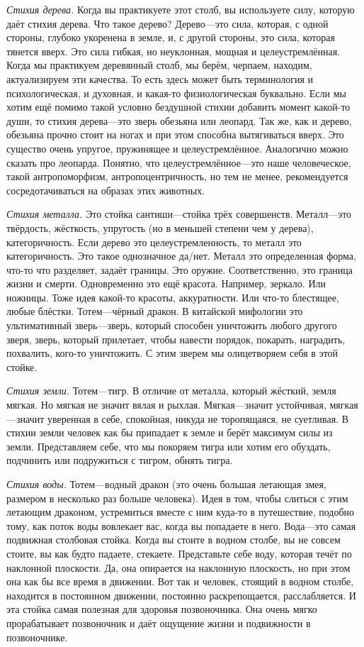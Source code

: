 {\it Стихия дерева.}
Когда вы практикуете этот столб,
вы используете силу,
которую даёт стихия дерева.
Что такое дерево? Дерево---это сила,
которая, с одной стороны, глубоко укоренена
в земле, и, с другой стороны,
это сила, которая тянется вверх. Это сила гибкая,
но неуклонная,
мощная и
целеустремлённая.
Когда мы практикуем деревянный столб, мы
берём,
черпаем, находим,
актуализируем эти
качества. То есть здесь может быть терминология
и психологическая, и духовная,
и какая-то физиологическая буквально.
Если мы хотим ещё помимо
такой условно бездушной стихии
добавить момент какой-то души,
то стихия дерева---это зверь
обезьяна или леопард.
Так же, как и дерево,
обезьяна прочно стоит на ногах и при
этом способна вытягиваться вверх. Это существо очень
упругое, пружинящее и
целеустремлённое. Аналогично можно сказать про леопарда.
Понятно, что целеустремлённое---это наше человеческое,
такой антропоморфизм,
антропоцентричность, но тем не менее,
рекомендуется сосредотачиваться
на образах этих животных.

{\it Стихия металла.} Это стойка сантиши---стойка трёх
совершенств. Металл---это твёрдость,
жёсткость, упругость (но в меньшей степени чем у дерева),
категоричность. Если дерево это целеустремленность, то металл это категоричность.
Это такое
однозначное да/нет.
Металл это определенная форма, что-то что разделяет,
задаёт границы.
Это оружие. Соответственно, это граница жизни и смерти.
Одновременно это ещё красота. Например, зеркало.
Или ножницы. Тоже идея
какой-то красоты, аккуратности.
Или что-то блестящее, любые блёстки.
Тотем---чёрный дракон.
В китайской мифологии это ультимативный зверь---зверь, который способен уничтожить
любого другого зверя,
зверь, который прилетает, чтобы навести порядок,
покарать, наградить, похвалить,
кого-то уничтожить. С этим
зверем
мы олицетворяем себя в этой стойке.

{\it Стихия земли.} Тотем---тигр. В отличие
от металла, который жёсткий, земля мягкая.
Но мягкая не значит вялая и рыхлая.
Мягкая---значит устойчивая, мягкая---значит уверенная
в себе, спокойная, никуда не торопящаяся,
не суетливая.
В стихии земли человек
как бы припадает к земле и берёт
максимум силы из земли.
Представляем себе, что мы
покоряем тигра или хотим его обуздать, подчинить
или подружиться с тигром,
обнять тигра.

{\it Стихия воды.}
Тотем---водный дракон (это очень большая летающая змея,
размером в несколько раз больше человека).
Идея в том, чтобы слиться с этим
летающим драконом, устремиться вместе с ним куда-то
в путешествие, подобно тому, как поток воды
вовлекает вас, когда вы попадаете в него.
Вода---это самая подвижная столбовая
стойка. Когда вы стоите в водном столбе, вы не
совсем стоите, вы как будто падаете, стекаете. Представьте себе
воду, которая течёт по наклонной плоскости.
Да, она опирается на наклонную плоскость, но при
этом она как бы все время в движении.
Вот так и человек, стоящий в водном
столбе, находится в постоянном движении, постоянно раскрепощается,
расслабляется. И эта стойка самая полезная для
здоровья позвоночника. Она очень мягко прорабатывает позвоночник
и даёт ощущение жизни
и подвижности в позвоночнике.

